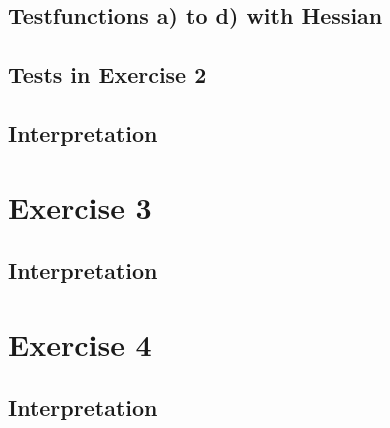 \documentclass{article}
\begin{document}
\subsection{Testfunctions a) to d) with Hessian}





\subsection{Tests in Exercise 2}


\subsection{Interpretation}

\section{Exercise 3}
\subsection{Interpretation}


\section{Exercise 4}
\subsection{Interpretation}
\end{document}
